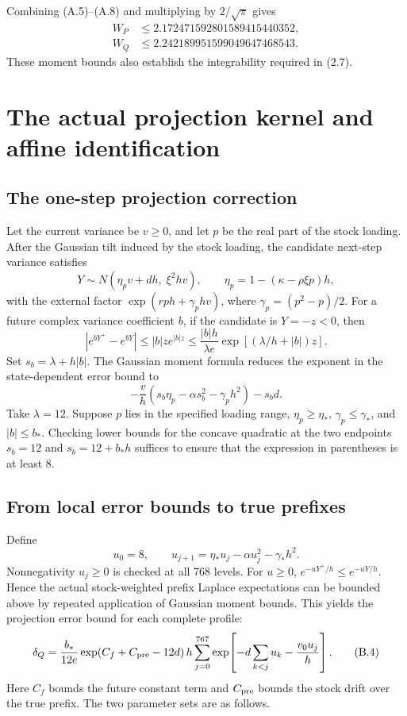 \documentclass[11pt,a4paper]{article}
\begin{document}
Combining (A.5)--(A.8) and multiplying by \(2/\sqrt\pi\) gives
\[
\begin{aligned}
W_P&\le2.172471592801589415440352,\\
W_Q&\le2.242189951599049647468543.
\end{aligned}
\tag{A.9}
\]
These moment bounds also establish the integrability required in (2.7).

\section{The actual projection kernel and affine identification}

\subsection{The one-step projection correction}

Let the current variance be \(v\ge0\), and let \(p\) be the real part of the stock loading. After the Gaussian tilt induced by the stock loading, the candidate next-step variance satisfies
\[
Y\sim N(\eta_pv+dh,\;\xi^2hv),\qquad
\eta_p=1-(\kappa-\rho\xi p)h,
\]
with the external factor \(\exp(rph+\gamma_p hv)\), where \(\gamma_p=(p^2-p)/2\). For a future complex variance coefficient \(b\), if the candidate is \(Y=-z<0\), then
\[
|e^{bY^+}-e^{bY}|
\le |b|z e^{|b|z}
\le \frac{|b|h}{\lambda e}
\exp[(\lambda/h+|b|)z].
\tag{B.1}
\]
Set \(s_b=\lambda+h|b|\). The Gaussian moment formula reduces the exponent in the state-dependent error bound to
\[
-\frac v h\left(s_b\eta_p-\alpha s_b^2-\gamma_ph^2\right)-s_bd.
\tag{B.2}
\]
Take \(\lambda=12\). Suppose \(p\) lies in the specified loading range, \(\eta_p\ge\eta_*\), \(\gamma_p\le\gamma_*\), and \(|b|\le b_*\). Checking lower bounds for the concave quadratic at the two endpoints \(s_b=12\) and \(s_b=12+b_*h\) suffices to ensure that the expression in parentheses is at least 8.

\subsection{From local error bounds to true prefixes}

Define
\[
u_0=8,\qquad u_{j+1}=\eta_*u_j-\alpha u_j^2-\gamma_*h^2.
\tag{B.3}
\]
Nonnegativity \(u_j\ge0\) is checked at all 768 levels. For \(u\ge0\), \(e^{-uY^+/h}\le e^{-uY/h}\). Hence the actual stock-weighted prefix Laplace expectations can be bounded above by repeated application of Gaussian moment bounds. This yields the projection error bound for each complete profile:
\[
\delta_Q=
\frac{b_*}{12e}\exp(C_f+C_{\rm pre}-12d)\,
h\sum_{j=0}^{767}
\exp\!\left[-d\sum_{k<j}u_k-\frac{v_0u_j}{h}\right].
\tag{B.4}
\]
Here \(C_f\) bounds the future constant term and \(C_{\rm pre}\) bounds the stock drift over the true prefix. The two parameter sets are as follows.
\end{document}
